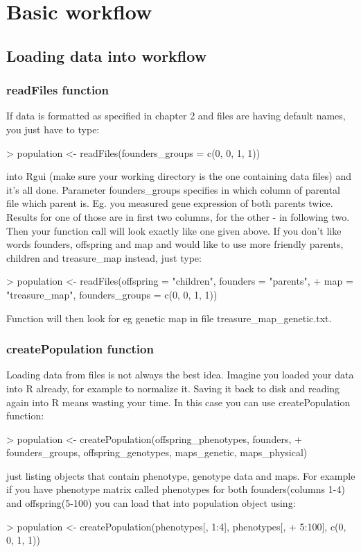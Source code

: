 \documentclass{article}
\begin{document}
\newpage
\section{Basic workflow}
\subsection{Loading data into workflow}
\subsubsection{readFiles function}
If data is formatted as specified in chapter 2 and files are having default names, you just have to type: 
\begin{Schunk}
\begin{Sinput}
> population <- readFiles(founders_groups = c(0, 0, 1, 1))
\end{Sinput}
\end{Schunk}
 into Rgui (make sure your working directory is the one containing data files) and it's all done. Parameter founders\_groups specifies in which column of parental file which parent is. Eg. you measured gene expression of both parents twice. Results for one of those are in first two columns, for the other - in following two. Then your function call will look exactly like one given above. 
If you don't like words founders, offspring and map and would like to use more friendly parents, children and treasure\_map instead, just type:
\begin{Schunk}
\begin{Sinput}
> population <- readFiles(offspring = "children", founders = "parents", 
+     map = "treasure_map", founders_groups = c(0, 0, 1, 1))
\end{Sinput}
\end{Schunk}
Function will then look for eg genetic map in file treasure\_map\_genetic.txt.
\subsubsection{createPopulation function}
Loading data from files is not always the best idea. Imagine you loaded your data into R already, for example to normalize it. Saving it back to disk and reading again into R means wasting your time. In this case you can use createPopulation function:
\begin{Schunk}
\begin{Sinput}
> population <- createPopulation(offspring_phenotypes, founders, 
+     founders_groups, offspring_genotypes, maps_genetic, maps_physical)
\end{Sinput}
\end{Schunk}
just listing objects that contain phenotype, genotype data and maps. For example if you have phenotype matrix called phenotypes for both founders(columns 1-4) and offspring(5-100) you can load that into population object using:
\begin{Schunk}
\begin{Sinput}
> population <- createPopulation(phenotypes[, 1:4], phenotypes[, 
+     5:100], c(0, 0, 1, 1))
\end{Sinput}
\end{Schunk}
\end{document}
